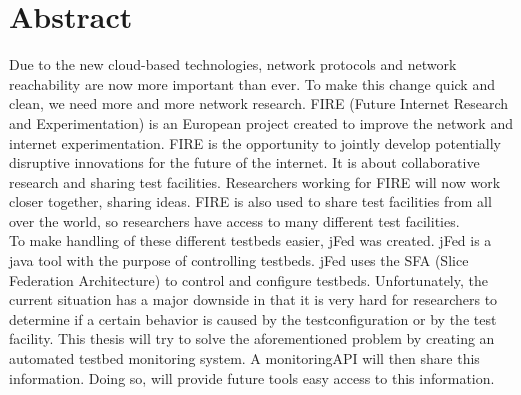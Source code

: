 \newpage
\chapter*{Abstract}
\npar
Due to the new cloud-based technologies, network protocols and network reachability are now more important than ever. To make this change quick and clean, we need more and more network research. FIRE (Future Internet Research and Experimentation) is an European project created to improve the network and internet experimentation. FIRE is the opportunity to jointly develop potentially disruptive innovations for the future of the internet. It is about collaborative research and sharing test facilities. Researchers working for FIRE will now work closer together, sharing ideas. FIRE is also used to share test facilities from all over the world, so researchers have access to many different test facilities.\\

To make handling of these different testbeds easier, jFed was created. jFed is a java tool with the purpose of controlling testbeds. jFed uses the SFA (Slice Federation Architecture) to control and configure testbeds. Unfortunately, the current situation has a major downside in that it is very hard for researchers to determine if a certain behavior is caused by the testconfiguration or by the test facility. 
\npar
This thesis will try to solve the aforementioned problem by creating an automated testbed monitoring system. A monitoringAPI will then share this information. Doing so, will provide future tools easy access to this information.